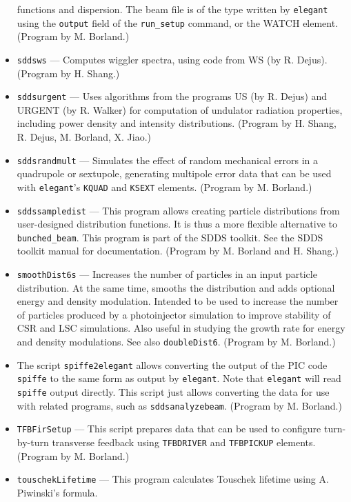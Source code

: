 \documentclass[11pt]{article}
\begin{document}
\begin{itemize}
        functions and dispersion.    The beam file
        is of the type written by {\tt elegant} using the {\tt output} field of the {\tt run\_setup}
        command, or the WATCH element. (Program by M. Borland.)
\item {\tt sddsws} --- Computes wiggler spectra, using code from WS (by R. Dejus).
  (Program by H. Shang.)
\item {\tt sddsurgent} --- Uses algorithms from the programs US (by R. Dejus) and URGENT (by R. Walker) for computation of undulator
  radiation properties, including power density and intensity distributions.  (Program by H. Shang, R. Dejus, M. Borland, X. Jiao.)
\item {\tt sddsrandmult} --- Simulates the effect of random mechanical errors in a quadrupole or sextupole,
  generating multipole error data that can be used with {\tt elegant}'s {\tt KQUAD} and {\tt KSEXT}
  elements. (Program by M. Borland.)
\item {\tt sddssampledist} --- This program allows creating particle
        distributions from user-designed distribution functions.  It is thus a more flexible alternative
        to \verb|bunched_beam|.  This program is part of the SDDS toolkit.  See the SDDS toolkit
        manual for documentation.  (Program by M. Borland and H. Shang.)
\item {\tt smoothDist6s} --- Increases the number of particles in an input particle distribution.  At the same
 time, smooths the distribution and adds optional energy and density modulation.   Intended to be used to increase the number of particles
 produced by a photoinjector simulation to improve stability of CSR and LSC simulations.  Also useful in studying 
 the growth rate for energy and density modulations.  See also {\tt doubleDist6}.
  (Program by M. Borland.)
\item The script \verb|spiffe2elegant| allows converting the output of the PIC code \verb|spiffe| to the same form
  as output by \verb|elegant|.  Note that \verb|elegant| will read \verb|spiffe| output directly. This script just allows converting the
  data for use with related programs, such as \verb|sddsanalyzebeam|.
  (Program by M. Borland.)
\item {\tt TFBFirSetup} --- This script prepares data that can be used to configure turn-by-turn transverse feedback using
  \verb|TFBDRIVER| and \verb|TFBPICKUP| elements.
  (Program by M. Borland.)
\item {\tt touschekLifetime} --- This program calculates Touschek lifetime using A. Piwinski's formula.

\end{itemize}
\end{document}
